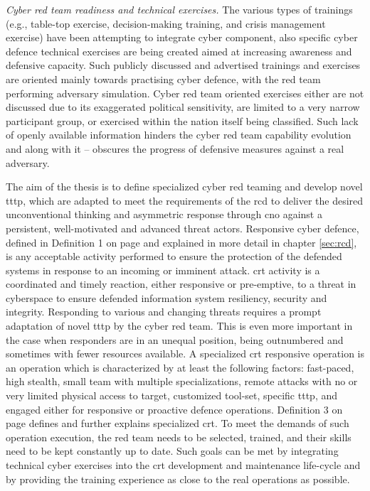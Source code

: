 \textit{Cyber red team readiness and technical exercises.}
The various types of trainings (e.g., table-top exercise, decision-making training, and crisis management exercise) have been attempting to integrate cyber component, also specific cyber defence technical exercises are being created aimed at increasing awareness and defensive capacity. Such publicly discussed and advertised trainings and exercises are oriented mainly towards practising cyber defence, with the red team performing adversary simulation. Cyber red team oriented exercises either are not discussed due to its exaggerated political sensitivity, are limited to a very narrow participant group, or exercised within the nation itself being classified. Such lack of openly available information hinders the cyber red team capability evolution and along with it -- obscures the progress of defensive measures against a real adversary.

The aim of the thesis is to define specialized cyber red teaming and develop novel \gls{tttp}, which are adapted to meet the requirements of the \gls{rcd} to deliver the desired unconventional thinking and asymmetric response through \gls{cno} against a persistent, well-motivated and advanced threat actors. Responsive cyber defence, defined in Definition 1 on page \pageref{def:rcd} and explained in more detail in chapter \ref{sec:rcd}, is any acceptable activity performed to ensure the protection of the defended systems in response to an incoming or imminent attack.
\gls{crt} activity is a coordinated and timely reaction, either responsive or pre-emptive, to a threat in cyberspace to ensure defended information system resiliency, security and integrity.
Responding to various and changing threats requires a prompt adaptation of novel \gls{tttp} by the cyber red team. This is even more important in the case when responders are in an unequal position, being outnumbered and sometimes with fewer resources available.
A specialized \gls{crt} responsive operation is an operation which is characterized by at least the following factors: fast-paced, high stealth, small team with multiple specializations, remote attacks with no or very limited physical access to target, customized tool-set, specific \gls{tttp}, and engaged either for responsive or proactive defence operations. Definition 3 on page \pageref{def:crt} defines and further explains specialized \gls{crt}.
To meet the demands of such operation execution, the red team needs to be selected, trained, and their skills need to be kept constantly up to date. Such goals can be met by integrating technical cyber exercises into the \gls{crt} development and maintenance life-cycle and by providing the training experience as close to the real operations as possible.


